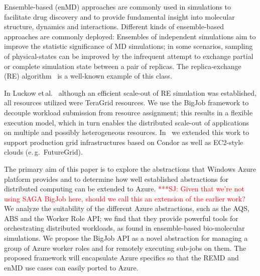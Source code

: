 \documentclass[conference,final]{IEEEtran}
\newcommand{\alnote}[1]{ {\textcolor{blue} { ***AL: #1 }}}
\newcommand{\jhanote}[1]{ {\textcolor{red} { ***SJ: #1 }}}
\newcommand{\alnote}[1]{}
\newcommand{\jhanote}[1]{}
\begin{document}
 



Ensemble-based (enMD) approaches are commonly used in simulations to
facilitate drug discovery and to provide fundamental insight into
molecular structure, dynamics and interactions.  Different kinds of
ensemble-based approaches are commonly deployed: Ensembles of
independent simulations aim to improve the statistic significance of
MD simulations; %
in some scenarios, sampling of physical-states can be improved by the
infrequent attempt to exchange partial or complete simulation state
between a pair of replicas. The replica-exchange (RE)
algorithm~\cite{hansmann} is a well-known example of this class. 

In Luckow et\,al.~\cite{repex_ptrs} although an efficient scale-out of RE
simulation was established, all resources utilized were TeraGrid
resources. We use the BigJob framework to decouple workload
submission from resource assignment; this results in a flexible
execution model, which in turn enables the distributed scale-out of
applications on multiple and possibly heterogeneous resources.
In~\cite{10.1109/CCGRID.2010.91} we extended this work to support
production grid infrastructures based on Condor as well as EC2-style
clouds (e.\,g.\ FutureGrid).
 
The primary aim of this paper is to explore the abstractions that
Windows Azure platform provides and to determine how well established
abstractions for distributed computing can be extended to Azure.
\jhanote{Given that we're not using SAGA BigJob here, should we call
  this an extension of the earlier work?}  We analyze the suitability
of the different Azure abstractions, such as
the AQS, ABS and the Worker Role API; we find that they provide
powerful tools for orchestrating distributed workloads, as found in
ensemble-based bio-molecular simulations.
We propose the BigJob API as a novel abstraction for managing a group
of Azure worker roles and for remotely executing sub-jobs on them. The
proposed framework will encapsulate Azure specifics so that the REMD
and enMD use cases can easily ported to Azure.  %
\end{document}

